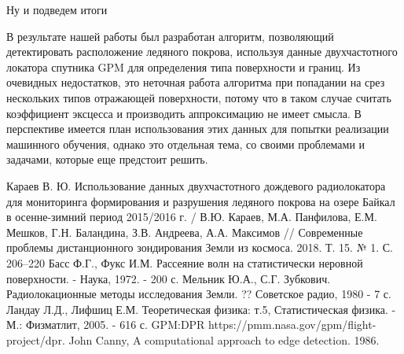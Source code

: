 Ну и подведем итоги

В результате нашей работы был разработан алгоритм, позволяющий детектировать расположение ледяного покрова, используя
данные двухчастотного локатора спутника GPM для определения типа поверхности и границ.
Из очевидных недостатков, это неточная работа алгоритма при попадании на срез нескольких типов отражающей поверхности,
потому что в таком случае считать коэффициент эксцесса и производить аппроксимацию не имеет смысла. 
В перспективе имеется план использования этих данных для попытки реализации машинного обучения, однако это отдельная
тема, со своими проблемами и задачами, которые еще предстоит решить. 


\newpage
{}
\begin{thebibliography}{99}
 Караев В. Ю. Использование данных двухчастотного дождевого радиолокатора для мониторинга формирования
и разрушения ледяного покрова на озере Байкал в осенне-зимний период 2015/2016 г. / В.Ю. Караев, М.А. Панфилова, Е.М.
Мешков, Г.Н. Баландина, З.В. Андреева, А.А. Максимов // Современные проблемы дистанционного зондирования Земли из
космоса. 2018. Т. 15. № 1. С. 206–220
 Басс Ф.Г., Фукс И.М. Рассеяние волн на статистически неровной поверхности. - Наука, 1972. - 200 с.
 Мельник Ю.А., С.Г. Зубкович. Радиолокационные методы исследования Земли. ?? Советское радио, 1980 - 7 с.
 Ландау Л.Д., Лифшиц Е.М. Теоретическая физика: т.5, Статистическая физика. - М.: Физматлит, 2005. - 616 с.
 GPM:DPR https://pmm.nasa.gov/gpm/flight-project/dpr.
 John Canny, A computational approach to edge detection. 1986.
\end{thebibliography}


